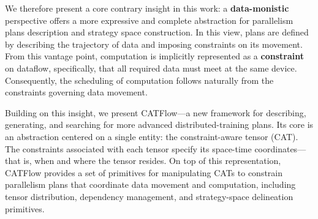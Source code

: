 \documentclass[letterpaper,twocolumn,10pt]{article}
\newcommand{\name}{CATFlow}
\begin{document}


We therefore present a core contrary insight in this work: a \textbf{data-monistic} perspective offers a more expressive and complete abstraction for parallelism plans description and strategy space construction. In this view, plans are defined by describing the trajectory of data and imposing constraints on its movement. From this vantage point, computation is implicitly represented as a \textbf{constraint} on dataflow, specifically, that all required data must meet at the same device. Consequently, the scheduling of computation follows naturally from the constraints governing data movement.

Building on this insight, we present \name{}—a new framework for describing, generating, and searching for more advanced distributed-training plans. Its core is an abstraction centered on a single entity: the constraint-aware tensor (CAT). The constraints associated with each tensor specify its space-time coordinates—that is, when and where the tensor resides. On top of this representation, \name{} provides a set of primitives for manipulating CATs to constrain parallelism plans that coordinate data movement and computation, including tensor distribution, dependency management, and strategy-space delineation primitives.
\end{document}
